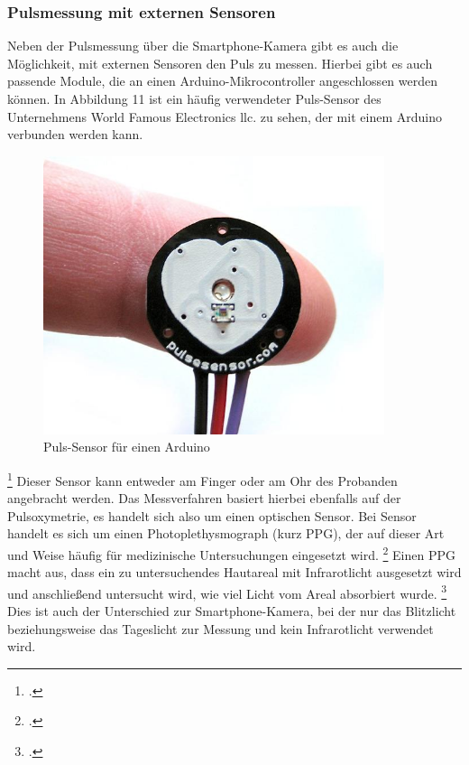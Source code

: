 {\subsubsection{Pulsmessung mit externen Sensoren}
Neben der Pulsmessung über die Smartphone-Kamera gibt es auch die Möglichkeit, mit externen Sensoren den Puls zu messen. Hierbei gibt es auch passende Module, die an einen Arduino-Mikrocontroller angeschlossen werden können. \newline
In Abbildung 11 ist ein häufig verwendeter Puls-Sensor des Unternehmens World Famous Electronics llc. zu sehen, der mit einem Arduino verbunden werden kann. \newline
\begin{figure}[h]
	\centering
	\includegraphics[width=10cm]{Bilder/pulsesensor.jpg}
	\caption[Puls-Sensor für einen Arduino]{Puls-Sensor für einen Arduino\footnotemark}
\end{figure}\footcitetext{Wor18a}
Dieser Sensor kann entweder am Finger oder am Ohr des Probanden angebracht werden. Das Messverfahren basiert hierbei ebenfalls auf der Pulsoxymetrie, es handelt sich also um einen optischen Sensor. Bei Sensor handelt es sich um einen Photoplethysmograph (kurz PPG), der auf dieser Art und Weise häufig für medizinische Untersuchungen eingesetzt wird. \footcite[Vgl. ][]{Wor18b}
Einen PPG macht aus, dass ein zu untersuchendes Hautareal mit Infrarotlicht ausgesetzt wird und anschließend untersucht wird, wie viel Licht vom Areal absorbiert wurde. \footcite[Vgl. ][S. 38]{Rab06}
Dies ist auch der Unterschied zur Smartphone-Kamera, bei der nur das Blitzlicht beziehungsweise das Tageslicht zur Messung und kein Infrarotlicht verwendet wird.
}
